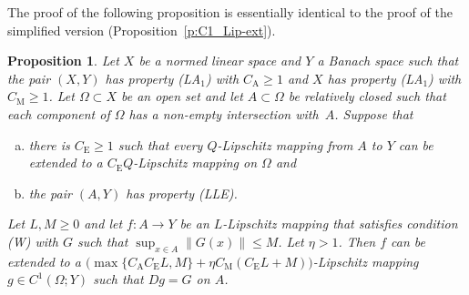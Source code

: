 \documentclass[a4paper,twoside,10pt,reqno,draft]{amsart}
\newtheorem{proposition}[theorem]{Proposition}
\theoremstyle{definition}
\theoremstyle{remark}
\newcommand\norm[1]{\mathopen\|#1\mathclose\|}
\newcommand\Om{\Omega}
\newcommand\pLA[1]{(LA$_#1$)}
\newcommand\pLLE{(LLE)}
\newcommand\cW{(W)}
\newcommand\cCA{C_{\mathrm A}}
\newcommand\cCM{C_{\mathrm M}}
\newcommand\cCE{C_{\mathrm E}}
\begin{document}
The proof of the following proposition is essentially identical to the proof of the simplified version (Proposition~\ref{p:C1_Lip-ext}).
\begin{proposition}\label{p:C1_Lip-ext2}
Let $X$ be a normed linear space and $Y$ a Banach space such that the pair $(X,Y)$ has property \pLA1 with $\cCA\ge1$ and $X$ has property \pLA1 with $\cCM\ge1$.
Let $\Om\subset X$ be an open set and let $A\subset\Om$ be relatively closed such that each component of $\Om$ has a non-empty intersection with~$A$.
Suppose that
\begin{enumerate}[(a)]
\item there is $\cCE\ge1$ such that every $Q$-Lipschitz mapping from $A$ to $Y$ can be extended to a $\cCE Q$-Lipschitz mapping on $\Om$ and
\item the pair $(A,Y)$ has property \pLLE.
\end{enumerate}
Let $L,M\ge0$ and let $f\colon A\to Y$ be an $L$-Lipschitz mapping that satisfies condition {\cW} with $G$ such that $\sup_{x\in A}\norm{G(x)}\le M$.
Let $\eta>1$.
Then $f$ can be extended to a $\bigl(\max\{\cCA C_{\mathrm E}L,M\}+\eta\cCM(C_{\mathrm E}L+M)\bigr)$-Lipschitz mapping $g\in C^1(\Om;Y)$ such that $Dg=G$ on $A$.
\end{proposition}
\end{document}
